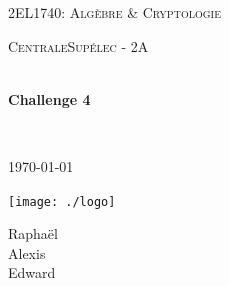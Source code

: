 \begin{titlepage}
\begin{center}


\LARGE \textsc{2EL1740: Algèbre \& Cryptologie}

\vspace{0.2cm}

\Large \textsc{CentraleSupélec - 2A}

\vspace{0.3cm}

\HRule \\[0.4cm]

{\huge \bfseries Challenge 4\\
[0.2cm]}

\HRule \\[0.4cm]

\vspace{2cm}

\textsc{\today}

\vspace{2cm}

\texttt{[image: ./logo]}~\\[3cm]

\begin{minipage}{0.4\textwidth}
\begin{spacing}{1.125}
\begin{center}
    Raphaël \\
    Alexis \\
    Edward 
\end{center}
\end{spacing}
\end{minipage}

\vfill

\end{center}
\end{titlepage}